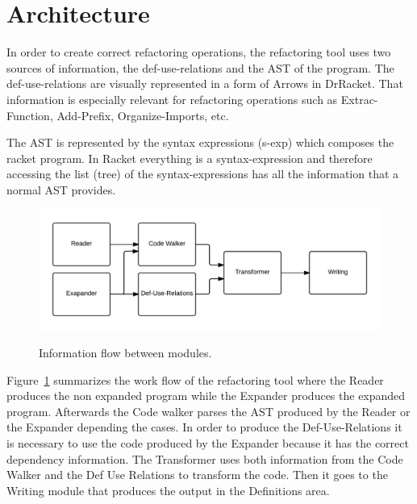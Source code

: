 
\section{Architecture}


In order to create correct refactoring operations, the refactoring tool uses two sources of
information, the def-use-relations and the AST of the program.
The def-use-relations are visually represented in a form of Arrows in DrRacket.
That information is especially relevant for refactoring operations such as Extrac-Function,
Add-Prefix, Organize-Imports, etc.

The AST is represented by the syntax expressions (s-exp) which composes the racket program.
In Racket everything is a syntax-expression and therefore accessing the list (tree)
of the syntax-expressions has all the information that a normal AST provides. %



\begin{figure}
\centering
\includegraphics[width=\linewidth]{refactoringTool-arch.png}
\label{architecture}
\caption{Information flow between modules.}
\end{figure}
Figure~\ref{architecture} summarizes the work flow of the refactoring tool where
the Reader produces the non expanded program while the Expander produces the
expanded program. Afterwards the Code walker parses the AST produced by the Reader or the Expander depending the
cases. In order to produce the Def-Use-Relations it is necessary to use the code produced by the
Expander because it has the correct dependency information.
The Transformer uses both information from the Code Walker and the Def Use Relations
to transform the code. Then it goes to the Writing module that produces the output
in the Definitions area.

